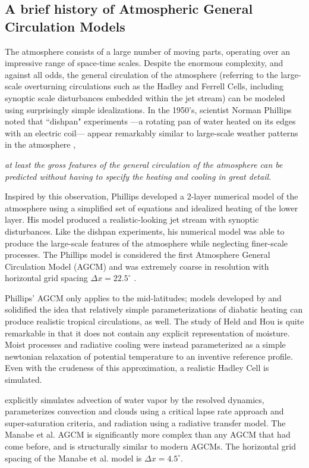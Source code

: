 \subsection{A brief history of Atmospheric General Circulation Models}

The atmosphere consists of a large number of moving parts, operating over an impressive range of space-time scales. Despite the enormous complexity, and against all odds, the general circulation of the atmosphere (referring to the large-scale overturning circulations such as the Hadley and Ferrell Cells, including synoptic scale disturbances embedded within the jet stream) can be modeled using surprisingly simple idealizations. In the 1950's, scientist Norman Phillips noted that  ``dishpan" experiments ---a rotating pan of water heated on its edges with an electric coil--- appear remarkably similar to large-scale weather patterns in the atmosphere \citep{WEART2008},
\begin{displayquote}
{\em{at least the gross features of the general circulation of the atmosphere can be predicted without having to specify the heating and cooling in great detail.}}
\end{displayquote}
Inspired by this observation, Phillips developed a 2-layer numerical model of the atmosphere using a simplified set of equations and idealized heating of the lower layer. His model produced a realistic-looking jet stream with synoptic disturbances. Like the dishpan experiments, his numerical model was able to produce the large-scale features of the atmosphere while neglecting finer-scale processes. The Phillips model is considered the first Atmosphere General Circulation Model (AGCM) and was extremely coarse in resolution with horizontal grid spacing $\Delta x = 22.5^{\circ}$ \citep{WEART2008}.

Phillips' AGCM only applies to the mid-latitudes; models developed by \cite{METAL1965MWR} and \cite{HH1980JAS} solidified the idea that relatively simple parameterizations of diabatic heating can produce realistic tropical circulations, as well. The study of Held and Hou is quite remarkable in that it does not contain any explicit representation of moisture. Moist processes and radiative cooling were instead parameterized as a simple newtonian relaxation of potential temperature to an inventive reference profile. Even with the crudeness of this approximation, a realistic Hadley Cell is simulated. 

\cite{METAL1965MWR} explicitly simulates advection of water vapor by the resolved dynamics, parameterizes convection and clouds using a critical lapse rate approach and super-saturation criteria, and radiation using a radiative transfer model. The Manabe et al. AGCM is significantly more complex than any AGCM that had come before, and is structurally similar to modern AGCMs. The horizontal grid spacing of the Manabe et al. model is $\Delta x = 4.5^{\circ}$.


